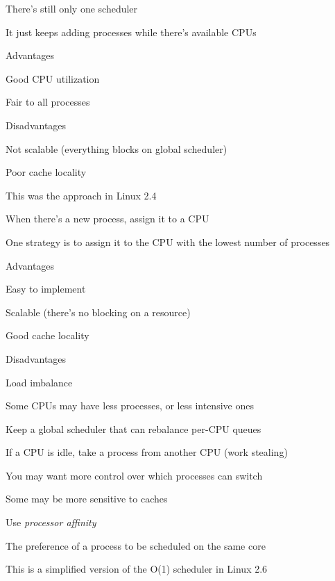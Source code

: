   \begin{slide}


    There's still only one scheduler

    \leftspace{}It just keeps adding processes while there's available CPUs
    \medskip

    Advantages

    \leftspace{}Good CPU utilization

    \leftspace{}Fair to all processes
    \medskip

    Disadvantages

    \leftspace{}Not scalable (everything blocks on global scheduler)

    \leftspace{}Poor cache locality
    \medskip

    This was the approach in Linux 2.4

  \end{slide}

  \begin{slide}


    When there's a new process, assign it to a CPU

    \leftspace{}One strategy is to assign it to the CPU with the lowest number of processes
    \medskip

    Advantages

    \leftspace{}Easy to implement

    \leftspace{}Scalable (there's no blocking on a resource)

    \leftspace{}Good cache locality
    \medskip

    Disadvantages

    \leftspace{}Load imbalance

    \leftspace{}\leftspace{}Some CPUs may have less processes, or less intensive ones

  \end{slide}

  \begin{slide}


    Keep a global scheduler that can rebalance per-CPU queues

    \leftspace{}If a CPU is idle, take a process from another CPU (work stealing)
    \medskip

    You may want more control over which processes can switch

    \leftspace{}Some may be more sensitive to caches
    \medskip

    Use \textit{processor affinity}

    \leftspace{}The preference of a process to be scheduled on the same core
    \medskip

    This is a simplified version of the O(1) scheduler in Linux 2.6

  \end{slide}

